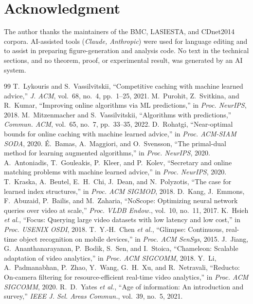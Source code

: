﻿\documentclass[lettersize,journal]{IEEEtran}
\begin{document}
\section*{Acknowledgment}
The author thanks the maintainers of the BMC, LASIESTA, and CDnet2014 corpora. AI-assisted tools (\emph{Claude, Anthropic}) were used for language editing and to assist in preparing figure-generation and analysis code. No text in the technical sections, and no theorem, proof, or experimental result, was generated by an AI system.

\begin{thebibliography}{99}
 T.~Lykouris and S.~Vassilvitskii, ``Competitive caching with machine learned advice,'' \emph{J. ACM}, vol.~68, no.~4, pp.~1--25, 2021.
 M.~Purohit, Z.~Svitkina, and R.~Kumar, ``Improving online algorithms via ML predictions,'' in \emph{Proc. NeurIPS}, 2018.
 M.~Mitzenmacher and S.~Vassilvitskii, ``Algorithms with predictions,'' \emph{Commun. ACM}, vol.~65, no.~7, pp.~33--35, 2022.
 D.~Rohatgi, ``Near-optimal bounds for online caching with machine learned advice,'' in \emph{Proc. ACM-SIAM SODA}, 2020.
 \'E.~Bamas, A.~Maggiori, and O.~Svensson, ``The primal-dual method for learning augmented algorithms,'' in \emph{Proc. NeurIPS}, 2020.
 A.~Antoniadis, T.~Gouleakis, P.~Kleer, and P.~Kolev, ``Secretary and online matching problems with machine learned advice,'' in \emph{Proc. NeurIPS}, 2020.
 T.~Kraska, A.~Beutel, E.~H.~Chi, J.~Dean, and N.~Polyzotis, ``The case for learned index structures,'' in \emph{Proc. ACM SIGMOD}, 2018.
 D.~Kang, J.~Emmons, F.~Abuzaid, P.~Bailis, and M.~Zaharia, ``NoScope: Optimizing neural network queries over video at scale,'' \emph{Proc. VLDB Endow.}, vol.~10, no.~11, 2017.
 K.~Hsieh \emph{et al.}, ``Focus: Querying large video datasets with low latency and low cost,'' in \emph{Proc. USENIX OSDI}, 2018.
 T.~Y.-H.~Chen \emph{et al.}, ``Glimpse: Continuous, real-time object recognition on mobile devices,'' in \emph{Proc. ACM SenSys}, 2015.
 J.~Jiang, G.~Ananthanarayanan, P.~Bodik, S.~Sen, and I.~Stoica, ``Chameleon: Scalable adaptation of video analytics,'' in \emph{Proc. ACM SIGCOMM}, 2018.
 Y.~Li, A.~Padmanabhan, P.~Zhao, Y.~Wang, G.~H.~Xu, and R.~Netravali, ``Reducto: On-camera filtering for resource-efficient real-time video analytics,'' in \emph{Proc. ACM SIGCOMM}, 2020.
 R.~D.~Yates \emph{et al.}, ``Age of information: An introduction and survey,'' \emph{IEEE J. Sel. Areas Commun.}, vol.~39, no.~5, 2021.

\end{thebibliography}
\end{document}
